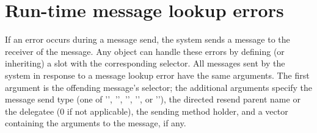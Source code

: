\documentclass[letterpaper,10pt,english]{sphinxmanual}
\begin{document}
\section{Run-time message lookup errors}
\label{\detokenize{vmref:index-6}}\label{\detokenize{vmref:run-time-message-lookup-errors}}
If an error occurs during a message send, the system sends a message to the receiver of the message.
Any object can handle these errors by defining (or inheriting) a slot with the corresponding
selector. All messages sent by the system in response to a message lookup error have the same arguments.
The first argument is the offending message’s selector; the additional arguments specify
the message send type (one of ’’, ’’, ’’, ’’,
or ’’), the directed resend parent name or the delegatee (0 if not
applicable), the sending method holder, and a vector containing the arguments to the message, if
any.
\end{document}
